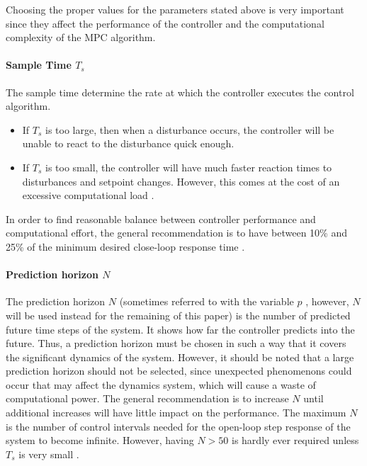 \documentclass{thesisreport}
\begin{document}
\noindent Choosing the proper values for the parameters stated above is very important since they affect the performance of the controller and the computational complexity of the MPC algorithm.

\paragraph{Sample Time $T_s$} 

The sample time determine the rate at which the controller executes the control algorithm. \begin{itemize}
	\item If $T_s$ is too large, then when a disturbance occurs, the controller will be unable to react to the disturbance quick enough.
	\item If $T_s$ is too small, the controller will have much faster reaction times to disturbances and setpoint changes. However, this comes at the cost of an excessive computational load \cite{MathWorks2018}.
\end{itemize}

\noindent In order to find reasonable balance between controller performance and computational effort, the general recommendation is to have between 10\% and 25\% of the minimum desired close-loop response time \cite{MathWorks2018}.

\paragraph{Prediction horizon $N$} 

The prediction horizon $N$ (sometimes referred to with the variable $p$ \cite{MathWorks2018}, however, $N$ will be used instead for the remaining of this paper) is the number of predicted future time steps of the system. It shows how far the controller predicts into the future. Thus, a prediction horizon must be chosen in such a way that it covers the significant dynamics of the system. However, it should be noted that a large prediction horizon should not be selected, since unexpected phenomenons could occur that may affect the dynamics system, which will cause a waste of computational power. The general recommendation is to increase $N$ until additional increases will have little impact on the performance. The maximum $N$ is the number of control intervals needed for the open-loop step response of the system to become infinite. However, having $N>50$ is hardly ever required unless $T_s$ is very small \cite{MathWorks2018}.
\end{document}
